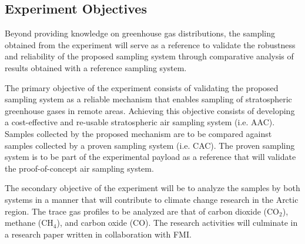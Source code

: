 \subsection{Experiment Objectives}

Beyond providing knowledge on greenhouse gas distributions, the sampling obtained from the experiment will serve as a reference to validate the robustness and reliability of the proposed sampling system through comparative analysis of results obtained with a reference sampling system.

The primary objective of the experiment consists of validating the proposed sampling system as a reliable mechanism that enables sampling of stratospheric greenhouse gases in remote areas. Achieving this objective consists of developing a cost-effective and re-usable stratospheric air sampling system (i.e. AAC). Samples collected by the proposed mechanism are to be compared against samples collected by a proven sampling system (i.e. CAC). The proven sampling system is to be part of the experimental payload as a reference that will validate the proof-of-concept air sampling system.

The secondary objective of the experiment will be to analyze the samples by both systems in a manner that will contribute to climate change research in the Arctic region. The trace gas profiles to be analyzed are that of carbon dioxide (CO$_{2}$), methane (CH$_{4}$), and carbon oxide (CO). The research activities will culminate in a research paper written in collaboration with FMI.